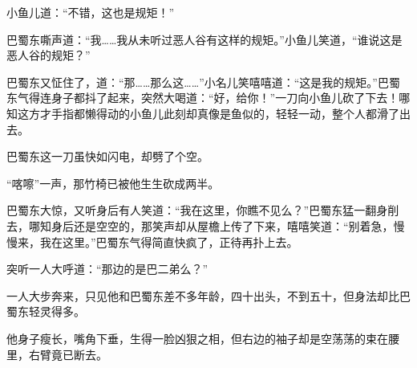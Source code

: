 \documentclass[12pt,oneside]{book}
\begin{document}
小鱼儿道：``不错，这也是规矩！''

巴蜀东嘶声道：``我\ldots\ldots 我从未听过恶人谷有这样的规矩。''小鱼儿笑道，``谁说这是恶人谷的规矩？''

巴蜀东又怔住了，道：``那\ldots\ldots 那么这\ldots\ldots{}''小名儿笑嘻嘻道：``这是我的规矩。''巴蜀东气得连身子都抖了起来，突然大喝道：``好，给你！''一刀向小鱼儿砍了下去！哪知这方才手指都懒得动的小鱼儿此刻却真像是鱼似的，轻轻一动，整个人都滑了出去。

巴蜀东这一刀虽快如闪电，却劈了个空。

``喀嚓''一声，那竹椅已被他生生砍成两半。

巴蜀东大惊，又听身后有人笑道：``我在这里，你瞧不见么？''巴蜀东猛一翻身削去，哪知身后还是空空的，那笑声却从屋檐上传了下来，嘻嘻笑道：``别着急，慢慢来，我在这里。''巴蜀东气得简直快疯了，正待再扑上去。

突听一人大呼道：``那边的是巴二弟么？''

一人大步奔来，只见他和巴蜀东差不多年龄，四十出头，不到五十，但身法却比巴蜀东轻灵得多。

他身子瘦长，嘴角下垂，生得一脸凶狠之相，但右边的袖子却是空荡荡的束在腰里，右臂竟已断去。
\end{document}
